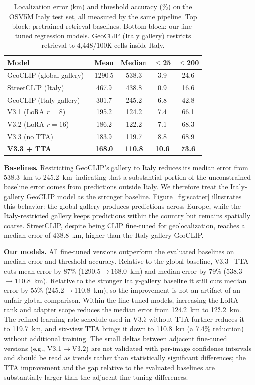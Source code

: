 \documentclass[10pt,twocolumn,letterpaper]{article}
\begin{document}
\begin{table}[t]
\centering\small
\begin{tabular}{@{}lcccc@{}}
\toprule
Model & Mean & Median & $\leq$25 & $\leq$200 \\
\midrule
GeoCLIP (global gallery)~\cite{geoclip} & 1290.5 & 538.3 & 3.9 & 24.6 \\
StreetCLIP (Italy)~\cite{streetclip}    & 467.9  & 438.8 & 0.9 & 16.6 \\
GeoCLIP (Italy gallery)                 & 301.7  & 245.2 & 6.8 & 42.8 \\
\midrule
V3.1 (LoRA $r{=}8$)                      & 195.2  & 124.2 & 7.4 & 66.1 \\
V3.2 (LoRA $r{=}16$)                     & 186.2  & 122.2 & 7.1 & 68.3 \\
V3.3 (no TTA)                            & 183.9  & 119.7 & 8.8 & 68.9 \\
\textbf{V3.3 + TTA}              & \textbf{168.0} & \textbf{110.8} & \textbf{10.6} & \textbf{73.6} \\
\bottomrule
\end{tabular}
\smallskip
\caption{Localization error (km) and threshold accuracy (\%) on the OSV5M Italy
test set, all measured by the same pipeline. Top block: pretrained retrieval
baselines. Bottom block: our fine-tuned regression models. GeoCLIP (Italy
gallery) restricts retrieval to 4{,}448/100K cells inside Italy.}
\label{tab:main}
\end{table}

\noindent\textbf{Baselines.} Restricting GeoCLIP's gallery to Italy reduces its
median error from 538.3~km to 245.2~km, indicating that a substantial portion of
the unconstrained baseline error comes from predictions outside Italy. We
therefore treat the Italy-gallery GeoCLIP model as the stronger baseline.
Figure~\ref{fig:scatter} illustrates this behavior: the global gallery produces
predictions across Europe, while the Italy-restricted gallery keeps predictions
within the country but remains spatially coarse. StreetCLIP, despite being CLIP
fine-tuned for geolocalization, reaches a median error of 438.8~km, higher than
the Italy-gallery GeoCLIP.

\noindent\textbf{Our models.} All fine-tuned versions outperform the evaluated
baselines on median error and threshold accuracy. Relative to the global
baseline, V3.3+TTA cuts mean error by 87\% (1290.5$\to$168.0~km) and median
error by 79\% (538.3$\to$110.8~km). Relative to the stronger Italy-gallery
baseline it still cuts median error by 55\% (245.2$\to$110.8~km), so the
improvement is not an artifact of an unfair global comparison. Within the
fine-tuned models, increasing the LoRA rank and adapter scope reduces the median
error from 124.2~km to 122.2~km. The refined learning-rate schedule used in
V3.3 without TTA further reduces it to 119.7~km, and six-view TTA brings it down
to 110.8~km (a 7.4\% reduction) without additional training.
The small deltas between adjacent fine-tuned versions (e.g., V3.1$\to$V3.2) are
not validated with per-image confidence intervals and should be read as trends
rather than statistically significant differences; the TTA improvement and the
gap relative to the evaluated baselines are substantially larger than the
adjacent fine-tuning differences.
\end{document}
